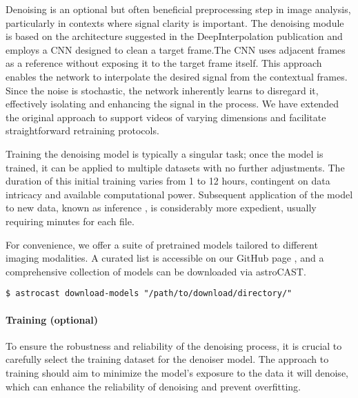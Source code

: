Denoising is an optional but often beneficial preprocessing step in image analysis, particularly in contexts where
signal clarity is important. The denoising module is based on the architecture suggested in the DeepInterpolation
publication\citep{lecoq_removing_2021, noauthor_alleninstitutedeepinterpolation_2024} and employs a \ac{CNN} designed
to clean a target frame.The \ac{CNN} uses adjacent frames as a reference without exposing it to the target frame
itself. This approach enables the network to interpolate the desired signal from the contextual frames. Since the
noise is stochastic, the network inherently learns to disregard it, effectively isolating and enhancing the signal in
the process. We have extended the original approach to support videos of varying dimensions and facilitate
straightforward retraining protocols.

Training the denoising model is typically a singular task; once the model is trained, it can be applied to multiple
datasets with no further adjustments. The duration of this initial training varies from 1 to 12 hours, contingent on
data intricacy and available computational power. Subsequent application of the model to new data, known as inference
, is considerably more expedient, usually requiring minutes for each file.

For convenience, we offer a suite of pretrained models tailored to different imaging modalities. A curated list is
accessible on our GitHub page \citep{noauthor_astrocastnotebooksexamplestrain_denoiser_modelsipynb_nodate}\missing{[
    GitHubModelsLink]}, and a comprehensive collection of models can be downloaded via astroCAST.

\begin{lstlisting}[style=bashStyle]
    $ astrocast download-models "/path/to/download/directory/"
\end{lstlisting}


\paragraph{Training (optional)}

To ensure the robustness and reliability of the denoising process, it is crucial to carefully select the training
dataset for the denoiser model. The approach to training should aim to minimize the model's exposure to the data it
will denoise, which can enhance the reliability of denoising and prevent overfitting.

